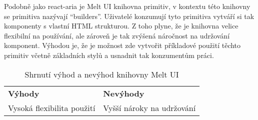 Podobně jako react-aria je Melt UI knihovna primitiv, v kontextu této knihovny se primitiva nazývají ``builders''.
Uživatelé konzumují tyto primitiva vytváří si tak komponenty s vlastní HTML strukturou.
Z toho plyne, že je knihovna velice flexibilní na používání, ale zároveň je tak zvýšená náročnost na udržování komponent.
Výhodou je, že je možnost zde vytvořit příkladové použití těchto primitiv včetně základních stylů a usnadnit tak konzumentům práci.

\begin{table}[ht]
    \begin{ctucolortab}
        \begin{tabularx}{\textwidth}{Y Y}
            \bfseries \textcolor{OK}{Výhody} & \bfseries \textcolor{NOT_OK}{Nevýhody} \\\Midrule{}
            Vysoká flexibilita použití       & Vyšší nároky na udržování
        \end{tabularx}
    \end{ctucolortab}
    \caption{Shrnutí výhod a nevýhod knihovny Melt UI}
\end{table}



